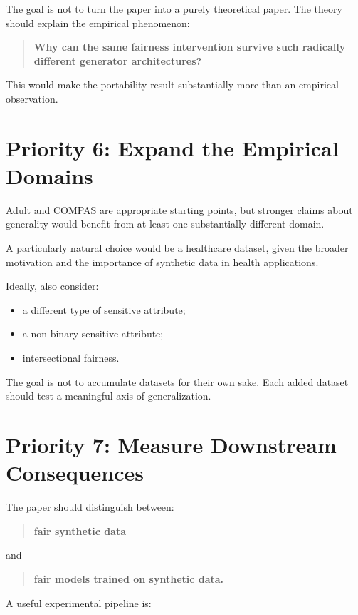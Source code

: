 \documentclass[11pt]{article}
\begin{document}
The goal is not to turn the paper into a purely theoretical paper. The theory should explain the empirical phenomenon:

\begin{quote}
\textbf{Why can the same fairness intervention survive such radically different generator architectures?}
\end{quote}

This would make the portability result substantially more than an empirical observation.

\section*{Priority 6: Expand the Empirical Domains}

Adult and COMPAS are appropriate starting points, but stronger claims about generality would benefit from at least one substantially different domain.

A particularly natural choice would be a healthcare dataset, given the broader motivation and the importance of synthetic data in health applications.

Ideally, also consider:

\begin{itemize}
    \item a different type of sensitive attribute;
    \item a non-binary sensitive attribute;
    \item intersectional fairness.
\end{itemize}

The goal is not to accumulate datasets for their own sake. Each added dataset should test a meaningful axis of generalization.

\section*{Priority 7: Measure Downstream Consequences}

The paper should distinguish between:

\begin{quote}
\textbf{fair synthetic data}
\end{quote}

and

\begin{quote}
\textbf{fair models trained on synthetic data.}
\end{quote}

A useful experimental pipeline is:
\end{document}
